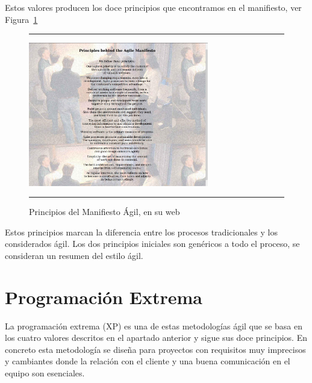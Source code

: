 Estos valores producen los doce principios que encontramos en el
manifiesto, ver Figura~\ref{fig:principios}

\begin{figure}[h]
\hrule\smallskip
\begin{center}
\includegraphics[width=0.7\textwidth]{fig/principios.jpg}
\end{center}
\caption{Principios del Manifiesto Ágil, en su web}
\label{fig:principios}
\hrule
\end{figure}

Estos principios marcan la diferencia entre los procesos tradicionales
y los considerados ágil. Los dos principios iniciales son genéricos a
todo el proceso, se consideran un resumen del estilo ágil.


\section{Programación Extrema}
\label{sec:xp}

La programación extrema (XP) es una de estas metodologías ágil que se
basa en los cuatro valores descritos en el apartado anterior y sigue
sus doce principios. En concreto esta metodología se diseña para
proyectos con requisitos muy imprecisos y cambiantes donde la relación
con el cliente y una buena comunicación en el equipo son esenciales.

